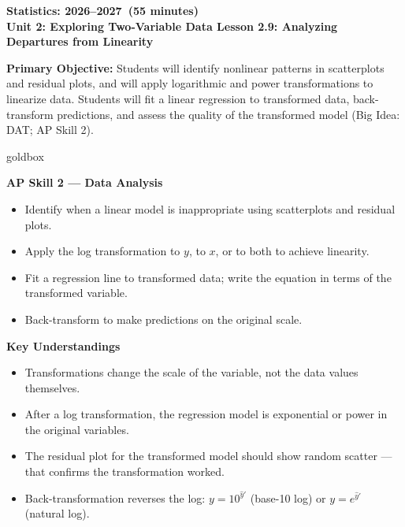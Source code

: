 \documentclass[10pt]{article}
\newcommand{\CourseName}{Statistics}
\newcommand{\SchoolYear}{2026--2027}
\newcommand{\MeetingLength}{55 minutes}
\newcommand{\UnitNumberName}{Unit 2: Exploring Two-Variable Data \quad}
\newcommand{\LessonNumberName}{Lesson 2.9: Analyzing Departures from Linearity}
\begin{document}
\begin{center}
    {\Large\bfseries \CourseName: \SchoolYear\ (\MeetingLength) \\
    {\small\bfseries \UnitNumberName \LessonNumberName}}
\end{center}

\begin{tcolorbox}[colback=sky,colframe=navy,boxrule=0.9pt,arc=2mm,
    left=2mm,right=2mm,top=1.5mm,bottom=1.5mm]
    \textbf{Primary Objective:} Students will identify nonlinear patterns in scatterplots and
    residual plots, and will apply logarithmic and power transformations to linearize data.
    Students will fit a linear regression to transformed data, back-transform predictions, and
    assess the quality of the transformed model (Big Idea: DAT; AP Skill 2).
\end{tcolorbox}

\begin{skillbox}{goldbox}
\begin{minipage}[t]{0.48\linewidth}
    \textbf{AP Skill 2 --- Data Analysis}
    \begin{itemize}
        \item Identify when a linear model is inappropriate using scatterplots and residual plots.
        \item Apply the log transformation to $y$, to $x$, or to both to achieve linearity.
        \item Fit a regression line to transformed data; write the equation in terms of the transformed variable.
        \item Back-transform to make predictions on the original scale.
    \end{itemize}
\end{minipage}
\hfill
\begin{minipage}[t]{0.48\linewidth}
    \textbf{Key Understandings}
    \begin{itemize}
        \item Transformations change the scale of the variable, not the data values themselves.
        \item After a log transformation, the regression model is exponential or power in the original variables.
        \item The residual plot for the transformed model should show random scatter --- that confirms the transformation worked.
        \item Back-transformation reverses the log: $y = 10^{\hat{y}'}$ (base-10 log) or $y = e^{\hat{y}'}$ (natural log).
    \end{itemize}
\end{minipage}
\end{skillbox}
\end{document}
